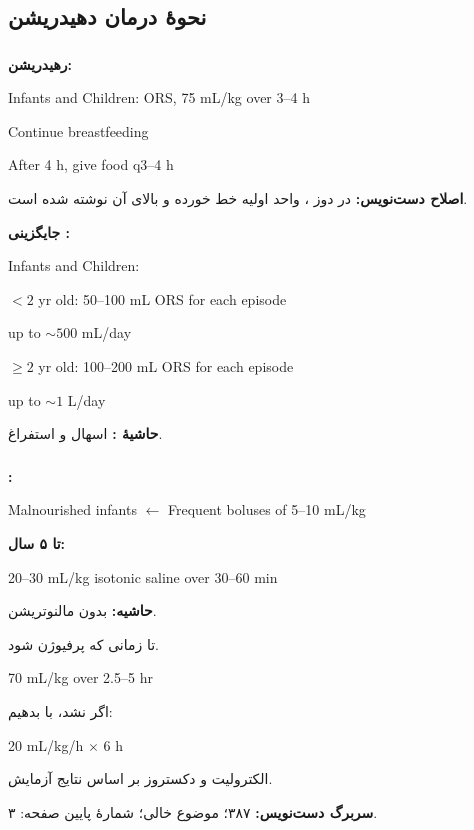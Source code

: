 \documentclass[12pt,a4paper]{article}
\begin{document}
\subsection*{نحوهٔ درمان دهیدریشن}
\subsubsection*{}
\textbf{رهیدریشن:}
\begin{latin}
Infants and Children: ORS, 75 mL/kg over 3--4 h

Continue breastfeeding

After 4 h, give food q3--4 h
\end{latin}
\textbf{اصلاح دست‌نویس:} در دوز ، واحد اولیه خط خورده و  بالای آن نوشته شده است.

\textbf{جایگزینی :}
\begin{latin}
Infants and Children:

\( <2 \) yr old: 50--100 mL ORS for each episode

up to \(\sim500\) mL/day

\(\geq2\) yr old: 100--200 mL ORS for each episode

up to \(\sim1\) L/day
\end{latin}
\textbf{حاشیهٔ :} اسهال و استفراغ.

\subsubsection*{}
\textbf{:}
\begin{latin}
Malnourished infants \(\longleftarrow\) Frequent boluses of 5--10 mL/kg
\end{latin}
\textbf{تا ۵ سال:}
\begin{latin}
20--30 mL/kg isotonic saline over 30--60 min
\end{latin}
\textbf{حاشیه:} بدون مالنوتریشن.

تا زمانی که پرفیوژن  شود.
\begin{latin}
70 mL/kg over 2.5--5 hr
\end{latin}

اگر  نشد،  با  بدهیم:
\begin{latin}
20 mL/kg/h \(\times\) 6 h
\end{latin}

الکترولیت و دکستروز بر اساس نتایج آزمایش.

\textbf{سربرگ دست‌نویس:} ۳۸۷؛ موضوع خالی؛ شمارهٔ پایین صفحه: ۳.
\end{document}
